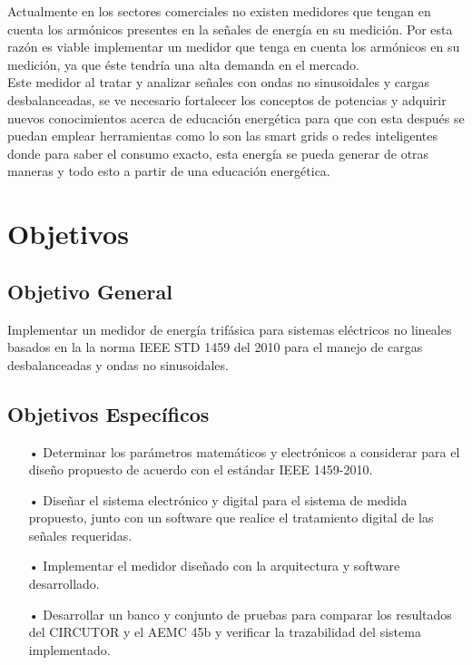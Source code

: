 Actualmente en los sectores comerciales no existen medidores que tengan en cuenta los armónicos presentes en la señales de energía en su medición. Por esta razón  es viable implementar un medidor que tenga en cuenta los armónicos en su medición, ya que éste tendría una alta demanda en el mercado. \\

Este medidor al tratar y analizar señales con ondas no sinusoidales y cargas desbalanceadas, se ve necesario fortalecer los conceptos de potencias y adquirir nuevos conocimientos acerca de educación energética para que con esta después se puedan emplear herramientas como lo son las smart grids o redes inteligentes donde para saber el consumo exacto, esta energía se pueda generar de otras maneras y todo esto a partir de una educación energética.


\newpage{\clearpage}
\chapter{Objetivos}
\section{Objetivo General}

Implementar un medidor de energía trifásica para sistemas eléctricos no lineales    basados en la la norma IEEE STD 1459 del 2010 para el manejo de cargas desbalanceadas y ondas no sinusoidales.

\section{Objetivos Específicos}
\begin{itemize} 
\item[•]Determinar los parámetros matemáticos y electrónicos a considerar para el diseño propuesto de acuerdo con el estándar IEEE 1459-2010. 

\item[•]	Diseñar el sistema electrónico y digital para el sistema de medida propuesto, junto con un software que realice el tratamiento digital de las señales requeridas.

\item[•] Implementar el medidor diseñado con la arquitectura y software desarrollado.

\item[•] Desarrollar un banco y conjunto de pruebas para comparar los resultados del CIRCUTOR y el AEMC 45b y verificar la trazabilidad del sistema implementado. 
 
\end{itemize}




